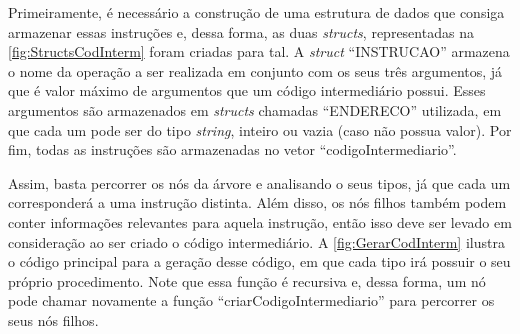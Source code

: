 \documentclass[
	12pt,				%
	oneside,
	a4paper,			%
	english,			%
	french,				%
	spanish,			%
	brazil,				%
	]{abntex2}
\begin{document}
Primeiramente, é necessário a construção de uma estrutura de dados que consiga armazenar essas instruções e, dessa forma, as duas \emph{structs}, representadas na \autoref{fig:StructsCodInterm} foram criadas para tal. A \emph{struct} ``INSTRUCAO'' armazena o nome da operação a ser realizada em conjunto com os seus três argumentos, já que é valor máximo de argumentos que um código intermediário possui. Esses argumentos são armazenados em \emph{structs} chamadas ``ENDERECO'' utilizada, em que cada um pode ser do tipo \emph{string}, inteiro ou vazia (caso não possua valor). Por fim, todas as instruções são armazenadas no vetor ``codigoIntermediario''.


Assim, basta percorrer os nós da árvore e analisando o seus tipos, já que cada um corresponderá a uma instrução distinta. Além disso, os nós filhos também podem conter informações relevantes para aquela instrução, então isso deve ser levado em consideração ao ser criado o código intermediário. A \autoref{fig:GerarCodInterm} ilustra o código principal para a geração desse código, em que cada tipo irá possuir o seu próprio procedimento. Note que essa função é recursiva e, dessa forma, um nó pode chamar novamente a função ``criarCodigoIntermediario'' para percorrer os seus nós filhos. 
\end{document}
